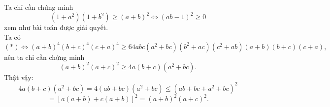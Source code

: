 \hda  Ta chỉ cần chứng minh \[\left( 1+{{a}^{2}} \right)\left( 1+{{b}^{2}} \right)\ge {{\left( a+b \right)}^{2}}\Leftrightarrow {{\left( ab-1 \right)}^{2}}\ge 0\] xem như bài toán được giải quyết.\\
\hda  Ta có
\[(*)\Leftrightarrow {{\left( a+b \right)}^{4}}{{\left( b+c \right)}^{4}}{{\left( c+a \right)}^{4}}\ge 64abc\left( {{a}^{2}}+bc \right)\left( {{b}^{2}}+ac \right)\left( {{c}^{2}}+ab \right)\left( a+b \right)\left( b+c \right)\left( c+a \right),\] nên ta chỉ cần chứng minh \[{{\left( a+b \right)}^{2}}{{\left( a+c \right)}^{2}}\ge 4a\left( b+c \right)\left( {{a}^{2}}+bc \right).\]
Thật vậy: \[4a\left( b+c \right)\left( {{a}^{2}}+bc \right)=4\left( ab+bc \right)\left( {{a}^{2}}+bc \right)\le {{\left( ab+bc+{{a}^{2}}+bc \right)}^{2}}\]
	\[={{\left[ a\left( a+b \right)+c\left( a+b \right) \right]}^{2}}={{\left( a+b \right)}^{2}}{{\left( a+c \right)}^{2}}.\]
